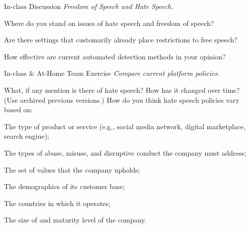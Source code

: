 \documentclass[nobackground,dvipsnames,table]{beamer}
\begin{document}
\begin{frame}{In-class Discussion \newline \emph{\small{Freedom of Speech and Hate Speech.}}}

Where do you stand on issues of hate speech and freedom of speech? \newline 

Are there settings that customarily already place restrictions to free speech? \newline 

How effective are current automated detection methods in your opinion? \newline 


\end{frame}



\begin{frame}{In-class \& At-Home Team Exercise \newline \emph{\small{Compare current platform policies.}}}

What, if any mention is there of hate speech? 
How has it changed over time? (Use archived previous versions.) 
How do you think hate speech policies vary based on:

\begin{itemize}
    \footnotesize{
    \item The type of product or service (e.g., social media network, digital marketplace, search engine);
    \item The types of abuse, misuse, and disruptive conduct the company must address;
    \item The set of values that the company upholds;
    \item The demographics of its customer base;
    \item The countries in which it operates;
    \item The size of and maturity level of the company.
    }
\end{itemize}

\end{frame}
\end{document}
